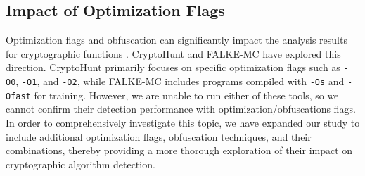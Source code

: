 
\subsection{Impact of Optimization Flags}

Optimization flags and obfuscation can significantly impact the analysis results for cryptographic functions \cite{ren2021unleashing}. CryptoHunt\cite{xu2017cryptographic} and FALKE-MC \cite{aigner2018falke} have explored this direction. CryptoHunt primarily focuses on specific optimization flags such as \texttt{-O0}, \texttt{-O1}, and \texttt{-O2}, while FALKE-MC includes programs compiled with \texttt{-Os} and \texttt{-Ofast} for training. However, we are unable to run either of these tools, so we cannot confirm their detection performance with optimization/obfuscations flags. In order to comprehensively investigate this topic, we have expanded our study to include additional optimization flags, obfuscation techniques, and their combinations, thereby providing a more thorough exploration of their impact on cryptographic algorithm detection.

